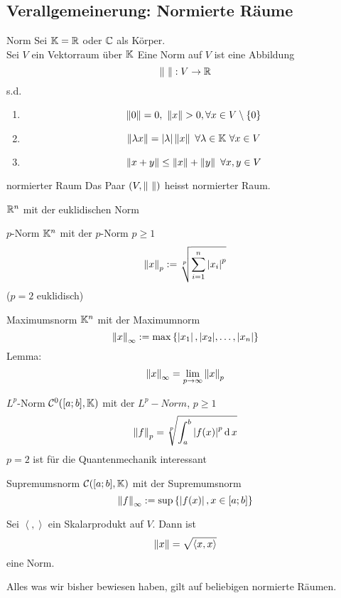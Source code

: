 \subsection{Verallgemeinerung: Normierte Räume}
\begin{Def}{Norm}
  Sei $\mathbb{K}=\mathbb{R}$ oder $\mathbb{C}$ als Körper.\\
  Sei $V$ ein Vektorraum über $\mathbb{K}$ Eine Norm auf $V$ ist eine Abbildung
  \[\Norm{\ }:V\to\mb{R}\]
  s.d.
  \begin{enumerate}
    \item \[\Norm{0}=0,\ \Norm{x}>0, \forall x\in V\setminus\{0\}\]
    \item \[\left\| \lambda x \right\|=\left| \lambda \right|\left\| x \right\|\ \forall \lambda\in\mathbb{K}\ \forall x\in V\]
    \item \[\Norm{x+y}\leq \Norm{x}+\Norm{y}\ \forall x,y\in V\]
  \end{enumerate}
\end{Def}
\begin{Def}{normierter Raum}
  Das Paar $(V,\left\| \  \right\|)$ heisst normierter Raum.
\end{Def}
\begin{Bsp}
  $\mathbb{R}^n$ mit der euklidischen Norm
\end{Bsp}
\begin{Bsp}{$p$-Norm}
  $\mathbb{K}^n$ mit der $p$-Norm $p\geq 1$
  \[\left\| x \right\|_p:=\sqrt[p]{\sum^n_{i=1}\left| x_i \right|^p}\]
  ($p=2$ euklidisch)
\end{Bsp}
\begin{Bsp}{Maximumsnorm}
    $\mathbb{K}^n$ mit der Maximumnorm
    \[\left\| x \right\|_\infty:=\max\left\{ \left| x_1 \right|,\mathopen| x_2 \mathclose|,\dots,\left| x_n \right| \right\}\]
    Lemma: \[\left\| x \right\|_\infty=\displaystyle\lim_{p\rightarrow\infty}\left\| x \right\|_p\]
\end{Bsp}
\begin{Bsp}{$L^p$-Norm}
  $\mathcal{C}^0([a;b],\mathbb{K})$ mit der $L^p-Norm$, $p\geq 1$
  \[\left\| f \right\|_p=\sqrt[p]{\int_a^b\left| f(x) \right|^p\operatorname{d} x}\]
  $p=2$ ist für die Quantenmechanik interessant
\end{Bsp}
\begin{Bsp}{Supremumsnorm}
  $\mathcal{C}([a;b],\mathbb{K})$ mit der Supremumsnorm
  \[\left\| f \right\|_\infty:=\sup\left\{ \left| f(x) \right|,x\in [a;b] \right\}\]
\end{Bsp}
\begin{Bsp}
  Sei $\left\langle , \right\rangle$ ein Skalarprodukt auf $V$. Dann ist
  \[\left\| x \right\|=\sqrt{\left\langle x,x \right\rangle }\]
  eine Norm.
\end{Bsp}
\begin{Bem}
  Alles was wir bisher bewiesen haben, gilt auf beliebigen normierte Räumen.
\end{Bem}
